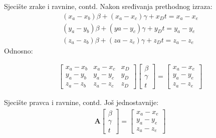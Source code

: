 \documentclass[9pt]{beamer}
\begin{document}
\begin{frame}{Sjecište zrake i ravnine, contd.}
	Nakon sređivanja prethodnog izraza:
	\begin{align*}
	(x_a-x_b)\beta + (x_a-x_c)\gamma + x_Dt=x_a-x_e\\
	(y_a-y_b)\beta + (ya-y_c)\gamma + y_Dt=y_a-y_e\\
	(z_a-z_b)\beta + (za-z_c)\gamma + z_Dt=z_a-z_e
	\end{align*}
	Odnosno:
	
	\begin{align*}
	\left[
	\begin{array}{ccc}
	x_a-x_b&  x_a-x_c&  x_D \\ 
	y_a-y_b&  y_a-y_c&  y_D  \\ 
	z_a-z_b&  z_a-z_c&  z_D
	\end{array} 
	\right]
	\left[
	\begin{array}{c}
	\beta \\ \gamma \\ t
	\end{array} 
	\right] =
	\left[
	\begin{array}{c}
	x_a-x_e \\ y_a-y_e \\ z_a-z_e
	\end{array} 
	\right]
	\end{align*}
\end{frame}	

\begin{frame}{Sjecište pravca i ravnine, contd.}
	Još jednostavnije:
	\begin{align*}
	\textbf{A}
	\left[
	\begin{array}{c}
	\beta \\ \gamma \\ t
	\end{array} 
	\right] =
	\left[
	\begin{array}{c}
	x_a-x_e \\ y_a-y_e \\ z_a-z_e
	\end{array} 
	\right]
	\end{align*}
	
\end{frame}
\end{document}
